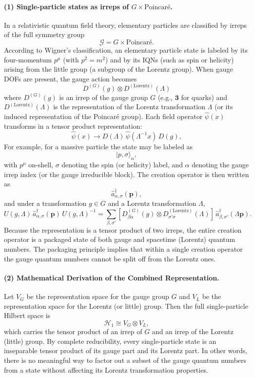 \documentclass[12pt,a4paper]{article}
\begin{document}
\paragraph{(1) Single-particle states as irreps of $G \times \mathrm{Poincaré}$.}
In a relativistic quantum field theory, elementary particles are classified by irreps of the full symmetry group
\[
\mathcal{G} = G \times \mathrm{Poincaré}.
\]
According to Wigner’s classification, an elementary particle state is labeled by its four-momentum $p^\mu$ (with $p^2 = m^2$) and by its IQNs (such as spin or helicity) arising from the little group (a subgroup of the Lorentz group).
When gauge DOFs are present, the gauge action becomes
\[
D^{(G)}(g) \otimes D^{(\mathrm{Lorentz})}(\Lambda)
\]
where $D^{(G)}(g)$ is an irrep of the gauge group $G$ (e.g., $\mathbf{3}$ for quarks) and $D^{(\mathrm{Lorentz})}(\Lambda)$ is the representation of the Lorentz transformation $\Lambda$ (or its induced representation of the Poincaré group).
Each field operator $\hat{\psi}(x)$ transforms in a tensor product representation:
\[
\hat{\psi}(x)\to D(\Lambda)\,\hat\psi(\Lambda^{-1}x)\,D(g),
\]
For example, for a massive particle the state may be labeled as
\[
|p,\sigma\rangle_\alpha,
\]
with $p^\mu$ on-shell, $\sigma$ denoting the spin (or helicity) label, and $\alpha$ denoting the gauge irrep index (or the gauge irreducible block).
The creation operator is then written as
\[
\hat{a}^\dagger_{\alpha,\sigma}(\mathbf{p}),
\]
and under a transformation $g \in G$ and a Lorentz transformation $\Lambda$,
\[
U(g,\Lambda) \, \hat{a}^\dagger_{\alpha,\sigma}(\mathbf{p})\, U(g,\Lambda)^{-1} 
= \sum_{\beta,\sigma'} \left[D^{(G)}_{\beta\alpha}(g) \otimes D^{(\mathrm{Lorentz})}_{\sigma'\sigma}(\Lambda)\right]\, \hat{a}^\dagger_{\beta,\sigma'}(\Lambda \mathbf{p}).
\]
Because the representation is a tensor product of two irreps, the entire creation operator is a packaged state of both gauge and spacetime (Lorentz) quantum numbers. The packaging principle implies that within a single creation operator the gauge quantum numbers cannot be split off from the Lorentz ones.


\paragraph{(2) Mathematical Derivation of the Combined Representation.}
Let $V_G$ be the representation space for the gauge group $G$ and $V_L$ be the representation space for the Lorentz (or little) group.
Then the full single-particle Hilbert space is
\[
\mathcal{H}_1 \cong V_G \otimes V_L,
\]
which carries the tensor product of an irrep of $G$ and an irrep of the Lorentz (little) group.
By complete reducibility, every single-particle state is an inseparable tensor product of its gauge part and its Lorentz part.
In other words, there is no meaningful way to factor out a subset of the gauge quantum numbers from a state without affecting its Lorentz transformation properties.
\end{document}
